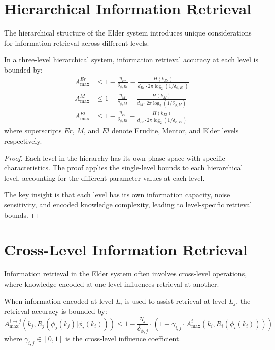 \section{Hierarchical Information Retrieval}

The hierarchical structure of the Elder system introduces unique considerations for information retrieval across different levels.

\begin{theorem}
In a three-level hierarchical system, information retrieval accuracy at each level is bounded by:
\begin{align}
A_{\max}^{Er} &\leq 1 - \frac{\eta_{Er}}{\delta_{\phi,Er}} - \frac{H(k_{Er})}{d_{Er} \cdot 2\pi \log_2(1/\delta_{\phi,Er})} \\
A_{\max}^{M} &\leq 1 - \frac{\eta_{M}}{\delta_{\phi,M}} - \frac{H(k_{M})}{d_{M} \cdot 2\pi \log_2(1/\delta_{\phi,M})} \\
A_{\max}^{El} &\leq 1 - \frac{\eta_{El}}{\delta_{\phi,El}} - \frac{H(k_{El})}{d_{El} \cdot 2\pi \log_2(1/\delta_{\phi,El})}
\end{align}
where superscripts $Er$, $M$, and $El$ denote Erudite, Mentor, and Elder levels respectively.
\end{theorem}

\begin{proof}
Each level in the hierarchy has its own phase space with specific characteristics. The proof applies the single-level bounds to each hierarchical level, accounting for the different parameter values at each level.

The key insight is that each level has its own information capacity, noise sensitivity, and encoded knowledge complexity, leading to level-specific retrieval bounds.
\end{proof}

\section{Cross-Level Information Retrieval}

Information retrieval in the Elder system often involves cross-level operations, where knowledge encoded at one level influences retrieval at another.

\begin{theorem}
When information encoded at level $L_i$ is used to assist retrieval at level $L_j$, the retrieval accuracy is bounded by:
\begin{equation}
A_{\max}^{i \rightarrow j}(k_j, R_j(\phi_j(k_j) | \phi_i(k_i))) \leq 1 - \frac{\eta_j}{\delta_{\phi,j}} \cdot \left(1 - \gamma_{i,j} \cdot A_{\max}^i(k_i, R_i(\phi_i(k_i)))\right)
\end{equation}
where $\gamma_{i,j} \in [0,1]$ is the cross-level influence coefficient.
\end{theorem}

